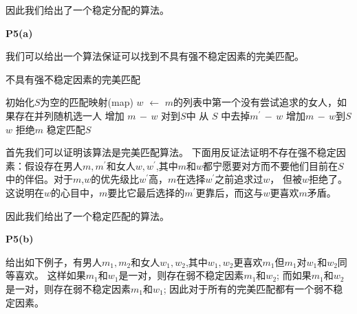 \documentclass{article}
\begin{document}
因此我们给出了一个稳定分配的算法。

\textbf{P5(a)}

我们可以给出一个算法保证可以找到不具有强不稳定因素的完美匹配。

\begin{algorithm}
\caption{不具有强不稳定因素的完美匹配}
\begin{algorithmic}[1]
\STATE 初始化$S$为空的匹配映射(map)
\STATE $w$ $\leftarrow$ $m$的列表中第一个没有尝试追求的女人，如果存在并列随机选一人
\STATE 增加 $m \,-\,w$ 对到$S$中 
\STATE 从 $S$ 中去掉$m^{\prime}\,-\,w$
\STATE 增加$m\,-\,w$到$S$
\ELSE
\STATE $w$ 拒绝$m$
\ENDIF
\ENDWHILE
\RETURN 稳定匹配$S$
\end{algorithmic}
\end{algorithm}
首先我们可以证明该算法是完美匹配算法。
下面用反证法证明不存在强不稳定因素：假设存在男人$m,m^{\prime}$和女人$w,w^{\prime}$,其中$m$和$w$都宁愿要对方而不要他们目前在$S$中的伴侣。对于$m$,$w$的优先级比$w^{\prime}$高，$m$在选择$w^{\prime}$之前追求过$w$， 但被$w$拒绝了。这说明在$w$的心目中，$m$要比它最后选择的$m^{\prime}$更靠后，而这与$w$更喜欢$m$矛盾。

因此我们给出了一个稳定匹配的算法。

\textbf{P5(b)}

给出如下例子，有男人$m_1,m_2$和女人$w_1,w_2$,其中$w_1,w_2$更喜欢$m_1$但$m_1$对$w_1$和$w_2$同等喜欢。
这样如果$m_1$和$w_1$是一对，则存在弱不稳定因素$m_1$和$w_2$;
而如果$m_1$和$w_2$是一对，则存在弱不稳定因素$m_1$和$w_1$;
因此对于所有的完美匹配都有一个弱不稳定因素。
\end{document}
